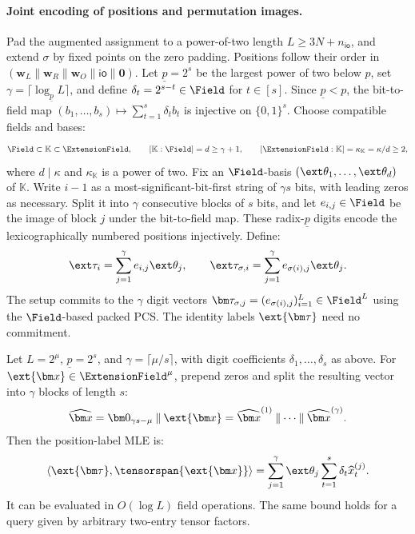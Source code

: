 \paragraph{Joint encoding of positions and permutation images.}
Pad the augmented assignment to a power-of-two length
\(L\geq3N+n_{\mathsf{io}}\), and extend \(\sigma\) by fixed points
on the zero padding.
Positions follow their order in
\((\bm w_L\mathbin{\|}\bm w_R\mathbin{\|}\bm w_O
\mathbin{\|}\bm{\mathsf{io}}\mathbin{\|}\bm0)\).
Let \(\underline p=2^s\) be the largest power of two below \(p\),
set \(\gamma=\lceil\log_{\underline p}L\rceil\), and define
\(\delta_t=2^{s-t}\in\Field\) for \(t\in[s]\).
Since \(\underline p<p\), the bit-to-field map
\((b_1,\ldots,b_s)\mapsto\sum_{t=1}^s\delta_tb_t\)
is injective on \(\{0,1\}^s\).
Choose compatible fields and bases:
\begin{equation}
    \Field\subset\mathbb K\subset\ExtensionField,
    \qquad [\mathbb K:\Field]=d\geq\gamma+1,
    \qquad [\ExtensionField:\mathbb K]
       =\kappa_{\mathbb K}=\kappa/d\geq2,
\label{eq:together-field-tower}
\end{equation}
where \(d\mid\kappa\) and \(\kappa_{\mathbb K}\) is a power of two.
Fix an \(\Field\)-basis
\((\ext\theta_1,\ldots,\ext\theta_d)\) of \(\mathbb K\).
Write \(i-1\) as a most-significant-bit-first string of
\(\gamma s\) bits, with leading zeros as necessary.
Split it into \(\gamma\) consecutive blocks of \(s\) bits,
and let \(e_{i,j}\in\Field\) be the image of block \(j\)
under the bit-to-field map. These radix-\(\underline p\) digits
encode the lexicographically numbered positions injectively. Define:
\begin{equation}
    \ext\tau_i=\sum_{j=1}^{\gamma}e_{i,j}\ext\theta_j,
    \qquad
    \ext\tau_{\sigma,i}
       =\sum_{j=1}^{\gamma}e_{\sigma(i),j}\ext\theta_j.
\label{eq:together-wiring-encoding}
\end{equation}
The setup commits to the \(\gamma\) digit vectors
\(\bm\tau_{\sigma,j}=(e_{\sigma(i),j})_{i=1}^L\in\Field^L\)
using the \(\Field\)-based packed PCS.
The identity labels \(\ext{\bm\tau}\) need no commitment.

\begin{proposition}
\label{proposition:position-encoding-evaluation}
Let \(L=2^\mu\), \(\underline p=2^s\), and
\(\gamma=\lceil\mu/s\rceil\), with digit coefficients
\(\delta_1,\ldots,\delta_s\) as above.
For \(\ext{\bm x}\in\ExtensionField^\mu\), prepend zeros and
split the resulting vector into \(\gamma\) blocks of length \(s\):
\[
    \widehat{\bm x}
       =\bm0_{\gamma s-\mu}\mathbin{\|}\ext{\bm x}
       =\widehat{\bm x}^{(1)}\mathbin{\|}\cdots
          \mathbin{\|}\widehat{\bm x}^{(\gamma)}.
\]
Then the position-label MLE is:
\begin{equation}
    \left\langle\ext{\bm\tau},
       \tensorspan{\ext{\bm x}}\right\rangle
       =\sum_{j=1}^{\gamma}\ext\theta_j
          \sum_{t=1}^{s}\delta_t\widehat{x}^{(j)}_t.
\label{eq:position-encoding-evaluation}
\end{equation}
It can be evaluated in \(O(\log L)\) field operations.
The same bound holds for a query given by arbitrary two-entry
tensor factors.
\end{proposition}

